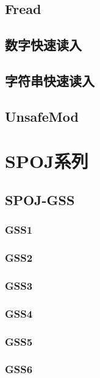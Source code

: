 \documentclass{article}
\begin{document}
\subsection{Fread} 

\subsection{数字快速读入} 

\subsection{字符串快速读入} 

\subsection{UnsafeMod} 


\newpage %
\section{SPOJ系列} %
\subsection{SPOJ-GSS} 
\subsubsection{GSS1} 

\subsubsection{GSS2} 

\subsubsection{GSS3} 

\subsubsection{GSS4} 

\subsubsection{GSS5} 

\subsubsection{GSS6} 

\end{document}
